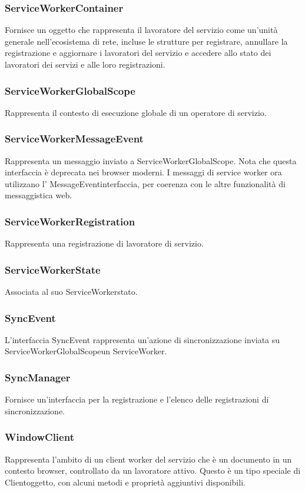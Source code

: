 \documentclass[italian]{article}
\begin{document}
\subsubsection{ServiceWorkerContainer}
Fornisce un oggetto che rappresenta il lavoratore del servizio come un'unità generale nell'ecosistema di rete, incluse le strutture per registrare, annullare la registrazione e aggiornare i lavoratori del servizio e accedere allo stato dei lavoratori dei servizi e alle loro registrazioni.
\subsubsection{ServiceWorkerGlobalScope}
Rappresenta il contesto di esecuzione globale di un operatore di servizio.
\subsubsection{ServiceWorkerMessageEvent}
Rappresenta un messaggio inviato a ServiceWorkerGlobalScope. Nota che questa interfaccia è deprecata nei browser moderni. I messaggi di service worker ora utilizzano l' MessageEventinterfaccia, per coerenza con le altre funzionalità di messaggistica web.
\subsubsection{ServiceWorkerRegistration}
Rappresenta una registrazione di lavoratore di servizio.
\subsubsection{ServiceWorkerState}
Associata al suo ServiceWorkerstato.
\subsubsection{SyncEvent}
L'interfaccia SyncEvent rappresenta un'azione di sincronizzazione inviata su ServiceWorkerGlobalScopeun ServiceWorker.
\subsubsection{SyncManager}
Fornisce un'interfaccia per la registrazione e l'elenco delle registrazioni di sincronizzazione.
\subsubsection{WindowClient}
Rappresenta l'ambito di un client worker del servizio che è un documento in un contesto browser, controllato da un lavoratore attivo. Questo è un tipo speciale di Clientoggetto, con alcuni metodi e proprietà aggiuntivi disponibili.
\end{document}

